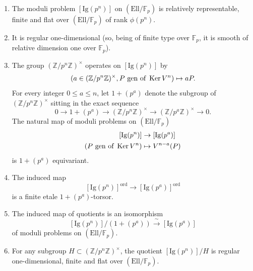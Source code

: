 \begin{kthm}[Igusa]\label{thm:12.6.1}
\begin{enumerate}[label=(\arabic*)]
\item The moduli problem $[\mathrm{Ig}(p^n)]$ on $(\mathrm{Ell}/\mathbb{F}_p)$ is relatively representable, finite and flat over $(\mathrm{Ell}/\mathbb{F}_p)$ of rank $\phi(p^n)$.
\item It is regular one-dimensional (so, being of finite type over $\mathbb{F}_p$, it is smooth of relative dimension one over $\mathbb{F}_p$).
\item The group $(\mathbb{Z}/p^n\mathbb{Z})^\times$ operates on $[\mathrm{Ig}(p^n)]$ by
\[
(a \in (\mathbb{Z}/p^n\mathbb{Z})^\times, P \text{ gen of } \operatorname{Ker} V^n) \mapsto a P .
\]
For every integer $0 \le a \le n$, let $1 + (p^a)$ denote the subgroup of $(\mathbb{Z}/p^n\mathbb{Z})^\times$ sitting in the exact sequence
\[
0 \to 1 + (p^a) \to (\mathbb{Z}/p^n\mathbb{Z})^\times \to (\mathbb{Z}/p^a\mathbb{Z})^\times \to 0 .
\]
The natural map of moduli problems on $(\mathrm{Ell}/\mathbb{F}_p)$
\[
\begin{aligned}
{[\mathrm{Ig}(p^n)]} &\to [\mathrm{Ig}(p^a)] \\
(P \text{ gen of } \operatorname{Ker} V^n) &\mapsto V^{n-a}(P)
\end{aligned}
\]
is $1 + (p^a)$ equivariant.
\item The induced map
\[
[\mathrm{Ig}(p^n)]^{\mathrm{ord}} \to [\mathrm{Ig}(p^a)]^{\mathrm{ord}}
\]
is a finite etale $1 + (p^a)$-torsor.
\item The induced map of quotients is an isomorphism
\[
[\mathrm{Ig}(p^n)]/(1 + (p^a)) \xrightarrow{\ \sim\ } [\mathrm{Ig}(p^a)]
\]
of moduli problems on $(\mathrm{Ell}/\mathbb{F}_p)$.
\item For any subgroup $H \subset (\mathbb{Z}/p^n\mathbb{Z})^\times$, the quotient $[\mathrm{Ig}(p^n)]/H$ is regular one-dimensional, finite and flat over $(\mathrm{Ell}/\mathbb{F}_p)$.
\end{enumerate}
\end{kthm}

